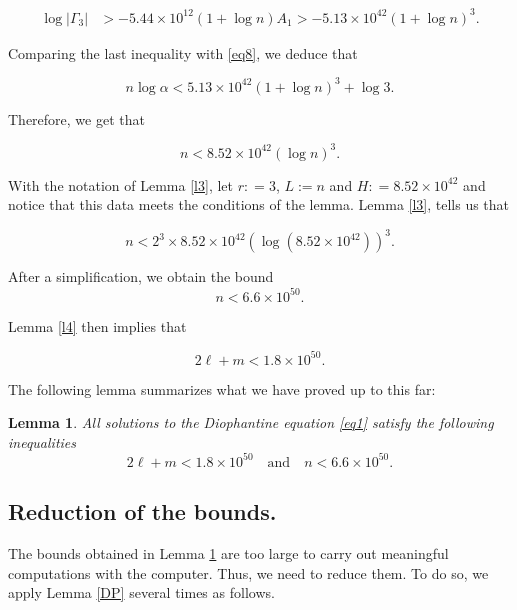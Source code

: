 \documentclass[10pt,a4paper]{article}
\newtheorem{lemma}{Lemma}
\begin{document}
\begin{align*}
\log |\Gamma_3| & > -5.44 \times 10^{12} (1 + \log n)A_1> -5.13 \times 10^{42} (1 + \log n)^3.
\end{align*}

\noindent Comparing the last inequality with \eqref{eq8}, we deduce that

\begin{equation*}
n \log \alpha < 5.13 \times 10^{42} (1 + \log n)^3 + \log 3.
\end{equation*}

\noindent Therefore, we get that 

\begin{equation*}
n < 8.52 \times 10^{42} (\log n)^3.
\end{equation*}

\noindent With the notation of Lemma \ref{l3}, let $r: = 3$, $L := n$ and $H: = 8.52 \times 10^{42}$ and notice that this data meets the conditions of the lemma. Lemma \ref{l3}, tells us that

\begin{equation*}
n < 2^3 \times 8.52 \times 10^{42} (\log (8.52 \times 10^{42}))^3.
\end{equation*}

\noindent After a simplification, we obtain the  bound
\begin{equation*}
n < 6.6 \times 10^{50}.
\end{equation*}

\noindent Lemma \ref{l4} then implies that

\begin{equation*}
2\ell +m < 1.8 \times 10^{50}.
\end{equation*}

\noindent The following lemma summarizes what we have proved up to this far:

\begin{lemma}\label{lemx}
All solutions to the Diophantine equation \eqref{eq1} satisfy the following inequalities
\begin{equation*}
2\ell + m < 1.8 \times 10^{50} \quad \text{and} \quad n < 6.6 \times 10^{50}.
\end{equation*}

\end{lemma}


\subsection{Reduction of the bounds.}
The bounds obtained in Lemma \ref{lemx} are too large to carry out meaningful computations with the computer. Thus, we need to reduce them. To do so, we apply Lemma \ref{DP} several times as follows.
\end{document}
